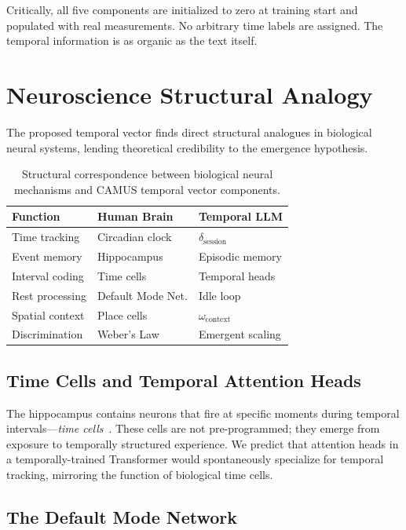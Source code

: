 \documentclass[10pt,twocolumn,letterpaper]{article}
\begin{document}
Critically, all five components are initialized to zero at training start and populated with real measurements. No arbitrary time labels are assigned. The temporal information is as organic as the text itself.

\section{Neuroscience Structural Analogy}

The proposed temporal vector finds direct structural analogues in biological neural systems, lending theoretical credibility to the emergence hypothesis.

\begin{table}[H]
\centering
\caption{Structural correspondence between biological neural mechanisms and CAMUS temporal vector components.}
\label{tab:analogy}
\small
\begin{tabular}{@{}lll@{}}
\toprule
\textbf{Function} & \textbf{Human Brain} & \textbf{Temporal LLM} \\
\midrule
Time tracking & Circadian clock & $\delta_{\text{session}}$ \\
Event memory & Hippocampus & Episodic memory \\
Interval coding & Time cells & Temporal heads \\
Rest processing & Default Mode Net. & Idle loop \\
Spatial context & Place cells & $\omega_{\text{context}}$ \\
Discrimination & Weber's Law & Emergent scaling \\
\bottomrule
\end{tabular}
\end{table}

\subsection{Time Cells and Temporal Attention Heads}

The hippocampus contains neurons that fire at specific moments during temporal intervals---\emph{time cells}~\cite{macdonald2011}. These cells are not pre-programmed; they emerge from exposure to temporally structured experience. We predict that attention heads in a temporally-trained Transformer would spontaneously specialize for temporal tracking, mirroring the function of biological time cells.

\subsection{The Default Mode Network}
\end{document}
